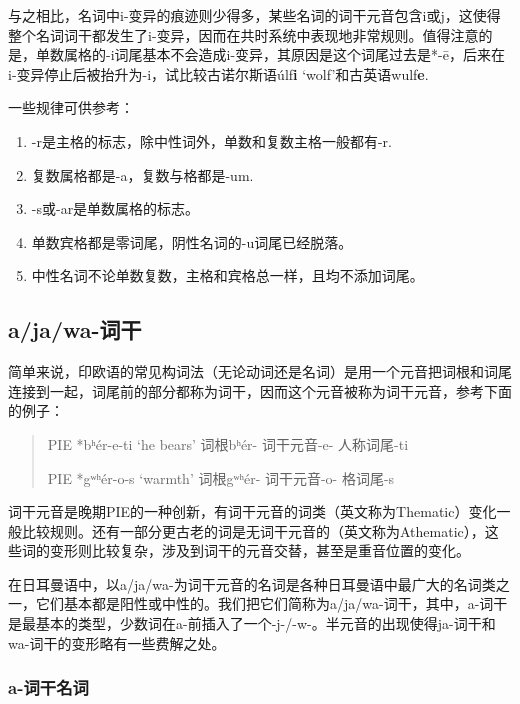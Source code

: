 与之相比，名词中i-变异的痕迹则少得多，某些名词的词干元音包含i或j，这使得整个名词词干都发生了i-变异，因而在共时系统中表现地非常规则。值得注意的是，单数属格的-i词尾基本不会造成i-变异，其原因是这个词尾过去是*-ē，后来在i-变异停止后被抬升为-i，试比较古诺尔斯语úlf\textbf{i}
`wolf'和古英语wulf\textbf{e}.

一些规律可供参考：

\begin{info}
  \begin{enumerate}[1.]
    \item -r是主格的标志，除中性词外，单数和复数主格一般都有-r.
    \item 复数属格都是-a，复数与格都是-um.
    \item -s或-ar是单数属格的标志。
    \item 单数宾格都是零词尾，阴性名词的-u词尾已经脱落。
    \item 中性名词不论单数复数，主格和宾格总一样，且均不添加词尾。


  \end{enumerate}
\end{info}

\subsection{a/ja/wa-词干}
\label{a/ja/wa-词干}

简单来说，印欧语的常见构词法（无论动词还是名词）是用一个元音把词根和词尾连接到一起，词尾前的部分都称为词干，因而这个元音被称为词干元音，参考下面的例子：

\begin{quote}
  PIE *bʰér-e-ti `he bears' 词根bʰér- 词干元音-e- 人称词尾-ti

  PIE *gʷʰér-o-s `warmth' 词根gʷʰér- 词干元音-o- 格词尾-s
\end{quote}

词干元音是晚期PIE的一种创新，有词干元音的词类（英文称为Thematic）变化一般比较规则。还有一部分更古老的词是无词干元音的（英文称为Athematic），这些词的变形则比较复杂，涉及到词干的元音交替，甚至是重音位置的变化。

在日耳曼语中，以a/ja/wa-为词干元音的名词是各种日耳曼语中最广大的名词类之一，它们基本都是阳性或中性的。我们把它们简称为a/ja/wa-词干，其中，a-词干是最基本的类型，少数词在a-前插入了一个-j-/-w-。半元音的出现使得ja-词干和wa-词干的变形略有一些费解之处。

\subsubsection{a-词干名词}

